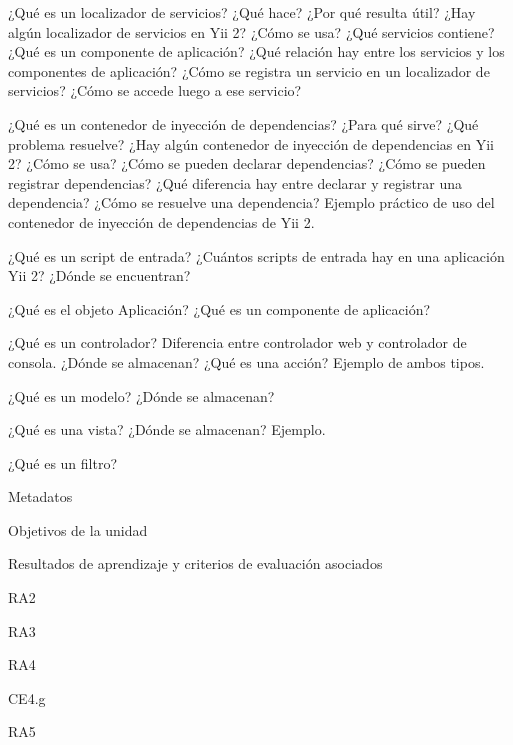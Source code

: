 \begin{longenum}
\begin{longenum}
\begin{longenum}
            \item ¿Qué es un localizador de servicios? ¿Qué hace? ¿Por qué resulta útil? ¿Hay algún localizador de servicios en Yii 2? ¿Cómo se usa? ¿Qué servicios contiene? ¿Qué es un componente de aplicación? ¿Qué relación hay entre los servicios y los componentes de aplicación? ¿Cómo se registra un servicio en un localizador de servicios? ¿Cómo se accede luego a ese servicio?
            \item ¿Qué es un contenedor de inyección de dependencias? ¿Para qué sirve? ¿Qué problema resuelve? ¿Hay algún contenedor de inyección de dependencias en Yii 2? ¿Cómo se usa? ¿Cómo se pueden declarar dependencias? ¿Cómo se pueden registrar dependencias? ¿Qué diferencia hay entre declarar y registrar una dependencia? ¿Cómo se resuelve una dependencia? Ejemplo práctico de uso del contenedor de inyección de dependencias de Yii 2.
            \item ¿Qué es un script de entrada? ¿Cuántos scripts de entrada hay en una aplicación Yii 2? ¿Dónde se encuentran?
            \item ¿Qué es el objeto Aplicación? ¿Qué es un componente de aplicación?
            \item ¿Qué es un controlador? Diferencia entre controlador web y controlador de consola. ¿Dónde se almacenan? ¿Qué es una acción? Ejemplo de ambos tipos.
            \item ¿Qué es un modelo? ¿Dónde se almacenan?
            \item ¿Qué es una vista? ¿Dónde se almacenan? Ejemplo.
            \item ¿Qué es un filtro?
        \end{longenum}
        \item Metadatos
        \begin{longenum}
            \item Objetivos de la unidad
            \item Resultados de aprendizaje y criterios de evaluación asociados
            \begin{longenum}
                \item RA2
                \item RA3
                \item RA4
                \begin{longenum}
                    \item CE4.g
                \end{longenum}
                \item RA5

\end{longenum}
\end{longenum}
\end{longenum}
\end{longenum}
